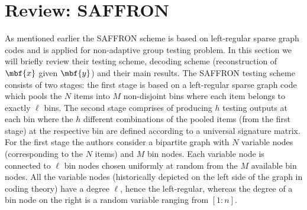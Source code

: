 \documentclass[conference,,twocolumn]{IEEEtran}
\DeclareMathOperator*{\bigORtxt}{\scalerel*{\text{$\vee$}}{\textstyle\sum}}
\begin{document}
%

\section{Review: SAFFRON}
\label{Sec:PriorWork}
As mentioned earlier the SAFFRON scheme \cite{lee2015saffron} is based on left-regular sparse graph codes and is applied for non-adaptive group testing problem. In this section we will briefly review their testing scheme, decoding scheme (reconstruction of $\mbf{x}$ given $\mbf{y}$) and their main results. The SAFFRON testing scheme consists of two stages: the first stage is based on a left-regular sparse graph code which pools the $N$ items into $M$ non-disjoint bins where each item belongs to exactly $\ell$ bins. The second stage comprises of producing $h$ testing outputs at each bin where the $h$ different combinations of the pooled items (from the first stage) at the respective bin are defined according to a universal signature matrix. For the first stage the authors consider a bipartite graph with $N$ variable nodes (corresponding to the $N$ items) and $M$ bin nodes. Each variable node is connected to $\ell$ bin nodes chosen uniformly at random from the $M$ available bin nodes. All the variable nodes (historically depicted on the left side of the graph in coding theory) have a degree $\ell$, hence the left-regular, whereas the degree of a bin node on the right is a random variable ranging from $[1:n]$.
\end{document}
